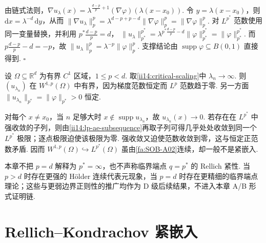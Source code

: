 \begin{FAProof}
由链式法则，\(\displaystyle\nabla u_\lambda(x)=\lambda^{\frac{d-p}{p}+1}(\nabla\varphi)(\lambda(x-x_0))\). 令 \(\displaystyle y=\lambda(x-x_0)\)，则 \(\displaystyle\mathrm{d}x=\lambda^{-d}\,\mathrm{d}y\)，从而 \(\displaystyle \|\nabla u_\lambda\|_p^p = \lambda^{d-p+p-d}\|\nabla\varphi\|_p^p = \|\nabla\varphi\|_p^p.\)
对 \(\displaystyle L^{p^*}\) 范数使用同一变量替换，并利用 \(\displaystyle p^*\frac{d-p}{p}=d\)， \(\displaystyle \|u_\lambda\|_{p^*}^{p^*} = \lambda^{p^*\frac{d-p}{p}-d}\|\varphi\|_{p^*}^{p^*} = \|\varphi\|_{p^*}^{p^*}.\)
而 \(\displaystyle p\frac{d-p}{p}-d=-p\)，故 \(\displaystyle\|u_\lambda\|_p^p=\lambda^{-p}\|\varphi\|_p^p\). 支撑结论由 \(\displaystyle\operatorname{supp}\varphi\subseteq B(0,1)\) 直接得到.
\hfill\(\square\)
\end{FAProof}

\begin{FACounterexample}[临界嵌入连续但一般不紧]\label{ce:ii14-critical-compact}
设 \(\displaystyle\Omega\subseteq\mathbb R^d\) 为有界 \(\displaystyle C^1\) 区域，\(\displaystyle1\leqslant p<d\). 取\autoref{ii14:critical-scaling}中 \(\displaystyle\lambda_n\to\infty\). 则 \(\displaystyle(u_{\lambda_n})\) 在 \(\displaystyle W^{1,p}(\Omega)\) 中有界，因为梯度范数恒定而 \(\displaystyle L^p\) 范数趋于零. 另一方面 \(\displaystyle\|u_{\lambda_n}\|_{p^*}=\|\varphi\|_{p^*}>0\) 恒定.

对每个 \(\displaystyle x\neq x_0\)，当 \(\displaystyle n\) 足够大时 \(\displaystyle x\notin\operatorname{supp}u_{\lambda_n}\)，故 \(\displaystyle u_{\lambda_n}(x)\to0\). 若存在在 \(\displaystyle L^{p^*}\) 中强收敛的子列，则由\autoref{ii14:lp-ae-subsequence}再取子列可得几乎处处收敛到同一个 \(\displaystyle L^{p^*}\) 极限；逐点极限迫使该极限为零. 强收敛又迫使范数收敛到零，这与恒定正范数矛盾. 因而 \(\displaystyle W^{1,p}(\Omega)\hookrightarrow L^{p^*}(\Omega)\) 虽由\autoref{fa:SOB-A02}连续，却一般不是紧嵌入.
\end{FACounterexample}

\begin{FAWarning}[端点边界]
本章不把 \(\displaystyle p=d\) 解释为 \(\displaystyle p^*=\infty\)，也不声称临界端点 \(\displaystyle q=p^*\) 的 Rellich 紧性. 当 \(\displaystyle p>d\) 时存在更强的 Hölder 连续代表元现象，当 \(\displaystyle p=d\) 时存在更精细的临界端点理论；这些与更弱边界正则性的推广均作为 D 级后续结果，不进入本章 A/B 形式证明链.
\end{FAWarning}

\section{Rellich--Kondrachov 紧嵌入}\label{sec:ii14-rellich}

